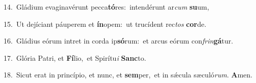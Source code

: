 {\numbfont\textcolor{\numbcolor}{14.}}~Gládium evaginavérunt pecca\-\textbf{tó}\-res:~\star intendérunt ar\textit{cum} \textbf{su}\-um,\par
{\numbfont\textcolor{\numbcolor}{15.}}~Ut dejíciant páuperem et \textbf{ín}\-opem:~\star ut trucídent rec\textit{tos} \textbf{cor}\-de.\par
{\numbfont\textcolor{\numbcolor}{16.}}~Gládius eórum intret in corda ip\-\textbf{só}\-rum:~\star et arcus eórum con\-\textit{frin}\-\textbf{gá}tur.\par
{\numbfont\textcolor{\numbcolor}{17.}}~Glória Patri, et \textbf{Fí}\-lio,~\star et Spirítu\textit{i} \textbf{Sanc}\-to.\par
{\numbfont\textcolor{\numbcolor}{18.}}~Sicut erat in princípio, et nunc, et \textbf{sem}\-per,~\star et in sǽcula sæculó\-\textit{rum}\-. \textbf{A}\-men.\par
